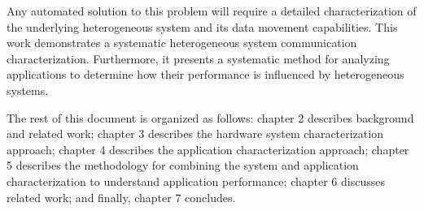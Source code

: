 Any automated solution to this problem will require a detailed characterization of the underlying heterogeneous system and its data movement capabilities.
This work demonstrates a systematic heterogeneous system communication characterization.
Furthermore, it presents a systematic method for analyzing applications to determine how their performance is influenced by heterogeneous systems.

The rest of this document is organized as follows:
chapter 2 describes background and related work;
chapter 3 describes the hardware system characterization approach;
chapter 4 describes the application characterization approach;
chapter 5 describes the methodology for combining the system and application characterization to understand application performance;
chapter 6 discusses related work;
and finally, chapter 7 concludes.
